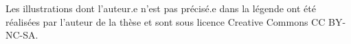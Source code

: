 \documentclass[%
	paper=A4,					%
	twoside=true,				%
	openright,					%
	parskip=full,				%
	chapterprefix=true,			%
	11pt,						%
	headings=normal,			%
	bibliography=totoc,			%
	listof=totoc,				%
	titlepage=on,				%
	captions=tableabove,		%
	draft=false,				%
]{scrreprt}%
\begin{document}
%




\printnoidxglossaries

\printindex[people]

{%
\renewcommand{\bibfont}{\normalfont\small}
\setlength{\biblabelsep}{0pt}
\setlength{\bibitemsep}{0.5\baselineskip plus 0.5\baselineskip}
\printbibliography[title={Bibliographie}, nottype=online]
}

\clearpage

{}
\listoffigures
\noindent Les illustrations dont l'auteur.e n'est pas précisé.e dans la légende ont été réalisées par l'auteur de la thèse et sont sous licence Creative Commons CC BY-NC-SA.

{}
{}
\listoftables

\clearpage




%
\newpage
\mbox{}

\end{document}
